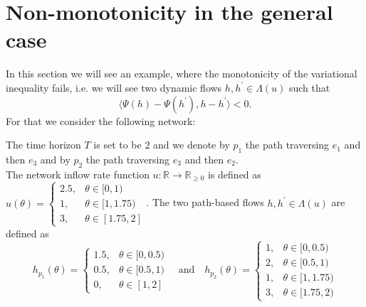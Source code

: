 \documentclass[reqno,openany]{amsbook}
\theoremstyle{definition}
\theoremstyle{plain}
\begin{document}
\section{Non-monotonicity in the general case}
In this section we will see an example, where the monotonicity of the variational inequality fails, i.e. we will see two dynamic flows $h, h^{\prime} \in \Lambda(u)$ such that 
\[ \langle \Psi(h) - \Psi(h^{\prime}), h - h^{\prime} \rangle < 0. \]
For that we consider the following network:\\
\begin{figure}[H]
\end{figure}
The time horizon $T$ is set to be $2$ and we denote by $p_1$ the path traversing $e_1$ and then $e_3$ and by $p_2$ the path traversing $e_3$ and then $e_2$. \\
The network inflow rate function $u: \mathbb{R} \to \mathbb{R}_{\geq 0}$ is defined as $u(\theta) = \begin{cases} 2.5,& \theta \in [0, 1) \\ 1,& \theta \in [1, 1.75) \\ 3,& \theta \in [1.75, 2] \end{cases}$. The two path-based flows $h, h^{\prime} \in \Lambda(u)$ are defined as  
\[ h_{p_1}(\theta) = \begin{cases} 1.5,& \theta \in [0, 0.5) \\ 0.5,& \theta \in [0.5, 1) \\ 0,& \theta \in [1, 2] \end{cases} \quad \text{and} \quad h_{p_2}(\theta) = \begin{cases} 1,& \theta \in [0, 0.5) \\ 2,& \theta \in [0.5, 1) \\ 1,& \theta \in [1, 1.75) \\ 3,& \theta \in [1.75, 2) \end{cases} \]
\end{document}
